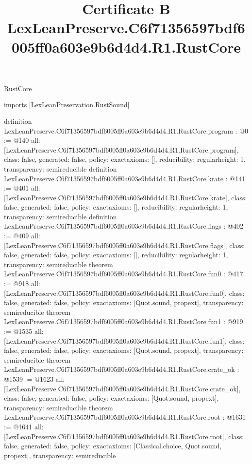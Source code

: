 \begin{lexlean}{RustCore}
\title{Certificate B LexLeanPreserve.C6f71356597bdf6005ff0a603e9b6d4d4.R1.RustCore}
\begin{coremodule}
imports [LexLeanPreservation.RustSound]

definition LexLeanPreserve.C6f71356597bdf6005ff0a603e9b6d4d4.R1.RustCore.program : @0 := @140 {
  all: [LexLeanPreserve.C6f71356597bdf6005ff0a603e9b6d4d4.R1.RustCore.program],
  class: false,
  generated: false,
  policy: exact{axioms: []},
  reducibility: regular{height: 1},
  transparency: semireducible
}
definition LexLeanPreserve.C6f71356597bdf6005ff0a603e9b6d4d4.R1.RustCore.krate : @141 := @401 {
  all: [LexLeanPreserve.C6f71356597bdf6005ff0a603e9b6d4d4.R1.RustCore.krate],
  class: false,
  generated: false,
  policy: exact{axioms: []},
  reducibility: regular{height: 1},
  transparency: semireducible
}
definition LexLeanPreserve.C6f71356597bdf6005ff0a603e9b6d4d4.R1.RustCore.flags : @402 := @409 {
  all: [LexLeanPreserve.C6f71356597bdf6005ff0a603e9b6d4d4.R1.RustCore.flags],
  class: false,
  generated: false,
  policy: exact{axioms: []},
  reducibility: regular{height: 1},
  transparency: semireducible
}
theorem LexLeanPreserve.C6f71356597bdf6005ff0a603e9b6d4d4.R1.RustCore.fun0 : @417 := @918 {
  all: [LexLeanPreserve.C6f71356597bdf6005ff0a603e9b6d4d4.R1.RustCore.fun0],
  class: false,
  generated: false,
  policy: exact{axioms: [Quot.sound, propext]},
  transparency: semireducible
}
theorem LexLeanPreserve.C6f71356597bdf6005ff0a603e9b6d4d4.R1.RustCore.fun1 : @919 := @1535 {
  all: [LexLeanPreserve.C6f71356597bdf6005ff0a603e9b6d4d4.R1.RustCore.fun1],
  class: false,
  generated: false,
  policy: exact{axioms: [Quot.sound, propext]},
  transparency: semireducible
}
theorem LexLeanPreserve.C6f71356597bdf6005ff0a603e9b6d4d4.R1.RustCore.crate_ok : @1539 := @1623 {
  all: [LexLeanPreserve.C6f71356597bdf6005ff0a603e9b6d4d4.R1.RustCore.crate_ok],
  class: false,
  generated: false,
  policy: exact{axioms: [Quot.sound, propext]},
  transparency: semireducible
}
theorem LexLeanPreserve.C6f71356597bdf6005ff0a603e9b6d4d4.R1.RustCore.root : @1631 := @1641 {
  all: [LexLeanPreserve.C6f71356597bdf6005ff0a603e9b6d4d4.R1.RustCore.root],
  class: false,
  generated: false,
  policy: exact{axioms: [Classical.choice, Quot.sound, propext]},
  transparency: semireducible
}


\end{coremodule}
\end{lexlean}

